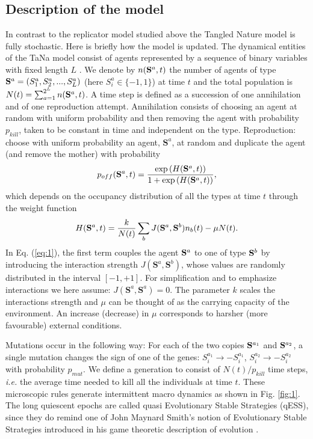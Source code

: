 \documentclass[12pt]{article}
\begin{document}
\subsection*{Description of the model}
In contrast to the replicator model studied above the Tangled Nature model is fully stochastic. Here is briefly how the model is updated. The dynamical entities of the TaNa model consist of  agents represented by a sequence of binary variables with fixed length $L$ \cite{Higgs/Derrida:article}. We denote by $n({\bf S}^a,t)$ the number of agents of type ${\bf S}^a=(S^a_1,S^a_2,...,S^a_L)$ (here $S^a_i\in\{-1,1\}$) at time $t$ and the total population is $N(t)=\sum_{a=1}^{2^L} n({\bf S}^{a},t)$. 
A time step is defined as a succession of one annihilation and of one reproduction attempt. Annihilation consists of choosing an agent at random with uniform probability and then removing the agent with probability $p_{kill}$, taken to be constant in time and independent on the type. Reproduction: choose with uniform probability an agent, $\textbf{S}^a$,  at random and duplicate the agent (and remove the mother) with probability
\begin{equation}
p_{off}({\bf S}^a,t)=\frac{\exp{(H({\bf S}^a,t))}}{1+\exp{(H({\bf S}^a,t))}},
\label{eq:2.3}  
\end{equation}
which depends on the occupancy distribution of all the types at time $t$ through the weight function
 \begin{equation}
H({\bf S}^a,t)= \frac{k}{N(t)}\sum_b J({\bf S}^a,{\bf S}^b)n_b(t) -\mu N(t).
\label{eq:1}
\end{equation}
In Eq. (\ref{eq:1}), the first term couples the agent ${\bf S}^a$ to one of type ${\bf S}^b$ by introducing the interaction strength $J(\mathbf{S}^a,\mathbf{S}^b)$, whose values are randomly distributed in the interval $\left[-1,+1\right]$. For simplification and to emphasize interactions we here assume: $J(\mathbf{S}^a,\mathbf{S}^a)=0$. The parameter $k$ scales  the interactions strength and $\mu$ can be thought of as the carrying capacity of the environment. An increase (decrease) in $\mu$ corresponds to harsher (more favourable) external conditions.

Mutations occur in the following way: For each of the two copies ${\bf S}^{a_1}$ and ${\bf S}^{a_2}$, a single mutation changes the sign of one of the genes: $ S^{a_1}_i\rightarrow -S^{a_1}_{i}$, $ S^{a_2}_i\rightarrow -S^{a_2}_{i}$ with probability $p_{mut}$. We define a generation to consist of $N(t)/p_{kill}$ time steps, \textit{i.e.} the average time needed to kill all the individuals at time $t$. These microscopic rules generate intermittent macro dynamics\cite{tana:article2} as shown in Fig. \ref{fig:1}. The long quiescent epochs are called quasi Evolutionary Stable Strategies (qESS), since they do remind one of John Maynard Smith's notion of Evolutionary Stable Strategies  introduced in his game theoretic description of evolution \cite{Maynard:book}. 
\end{document}
